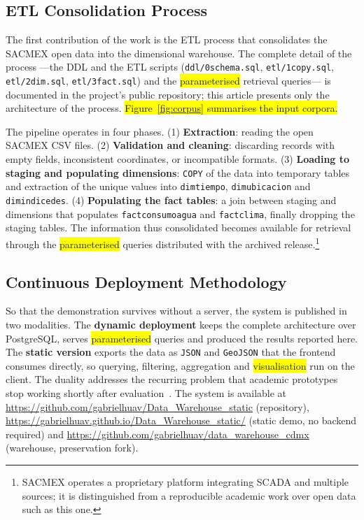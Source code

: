\documentclass[runningheads]{llncs}
\newif\ifmarcarcambios
\newcommand{\icokg}[1]{\ifmarcarcambios\textcolor{nuevo}{#1}\else#1\fi}
\newcommand{\nuevo}[1]{\colorbox{yellow}{#1}}
\renewcommand{\_}{\origunderscore\allowbreak}
\begin{document}
\subsection{ETL Consolidation Process}

The first contribution of the work is the ETL process that consolidates the SACMEX open data into the dimensional warehouse. The complete detail of the process \icokg{---the DDL and the ETL scripts (\texttt{ddl/0\_schema.sql}, \texttt{etl/1\_copy.sql}, \texttt{etl/2\_dim.sql}, \texttt{etl/3\_fact.sql}) and the \nuevo{parameterised} retrieval queries---} is documented in the project's public repository; this article presents only the architecture of the process. \nuevo{Figure~\ref{fig:corpus} summarises the input corpora.}

The pipeline operates in four phases. (1) \textbf{Extraction}: reading the open SACMEX CSV files. (2) \textbf{Validation and cleaning}: discarding records with empty fields, inconsistent coordinates, or incompatible formats. (3) \textbf{Loading to staging and populating dimensions}: \texttt{COPY} of the data into temporary tables and extraction of the unique values into \icokg{\texttt{dim\_tiempo}, \texttt{dim\_ubicacion} and \texttt{dim\_indice\_des}}. (4) \textbf{Populating the fact tables}: a join between staging and dimensions \icokg{that populates \texttt{fact\_consumo\_agua} and \texttt{fact\_clima}}, finally dropping the staging tables. \icokg{The information thus consolidated becomes available for retrieval through the \nuevo{parameterised} queries distributed with the archived release.}\footnote{SACMEX operates a proprietary platform integrating SCADA and multiple sources; it is distinguished from a reproducible academic work over open data such as this one.}





\subsection{Continuous Deployment Methodology}

So that the demonstration survives without a server, the system is published in
two modalities. The \textbf{dynamic deployment} keeps the complete architecture
\icokg{over PostgreSQL}, serves \nuevo{parameterised} queries and produced the results
reported here. The \textbf{static version} exports the data as \texttt{JSON} and
\texttt{GeoJSON} that the frontend consumes directly, so querying, filtering,
aggregation and \nuevo{visualisation} run on the client.
\icokg{The duality addresses the recurring problem that academic prototypes stop
working shortly after evaluation~\cite{sandve2013,hill2023}.} The system is
available at \icokg{\url{https://github.com/gabrielhuav/Data_Warehouse_static}
(repository), \url{https://gabrielhuav.github.io/Data_Warehouse_static/} (static
demo, no backend required) and
\url{https://github.com/gabrielhuav/data_warehouse_cdmx} (warehouse,
preservation fork)}.
\end{document}
